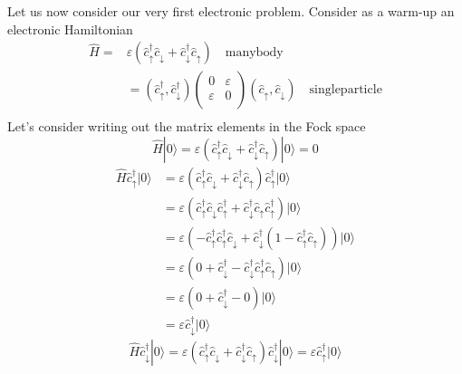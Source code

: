 Let us now consider our very first electronic problem. Consider as a warm-up an electronic Hamiltonian
\begin{align*}
    \hat{H}=&\varepsilon \left( \hat{c}_{\uparrow}^{\dagger}\hat{c}_{\downarrow}+\hat{c}_{\downarrow}^{\dagger}\hat{c}_{\uparrow} \right) \quad \mathrm{many body}\\
    &=\left( \hat{c}_{\uparrow}^{\dagger},\hat{c}_{\downarrow}^{\dagger} \right) \left( \begin{matrix}
        0&		\varepsilon\\
        \varepsilon&		0\\
    \end{matrix} \right) \left( \hat{c}_{\uparrow},\hat{c}_{\downarrow} \right) \quad \mathrm{single particle}\\
\end{align*}
Let's consider writing out the matrix elements in the Fock space
\[ \hat{H}|0\rangle =\varepsilon \left( \hat{c}_{\uparrow}^{\dagger}\hat{c}_{\downarrow}+\hat{c}_{\downarrow}^{\dagger}\hat{c}_{\uparrow} \right) |0\rangle =0\]
\begin{align*}
    \hat{H}\hat{c}_{\uparrow}^{\dagger}|0\rangle &=\varepsilon \left( \hat{c}_{\uparrow}^{\dagger}\hat{c}_{\downarrow}+\hat{c}_{\downarrow}^{\dagger}\hat{c}_{\uparrow} \right) \hat{c}_{\uparrow}^{\dagger}|0\rangle \\
    &=\varepsilon \left( \hat{c}_{\uparrow}^{\dagger}\hat{c}_{\downarrow}\hat{c}_{\uparrow}^{\dagger}+\hat{c}_{\downarrow}^{\dagger}\hat{c}_{\uparrow}\hat{c}_{\uparrow}^{\dagger} \right) |0\rangle \\
    &=\varepsilon \left( -\hat{c}_{\uparrow}^{\dagger}\hat{c}_{\uparrow}^{\dagger}\hat{c}_{\downarrow}+\hat{c}_{\downarrow}^{\dagger}\left( 1-\hat{c}_{\uparrow}^{\dagger}\hat{c}_{\uparrow} \right) \right) |0\rangle \\
    &=\varepsilon \left( 0+\hat{c}_{\downarrow}^{\dagger}-\hat{c}_{\downarrow}^{\dagger}\hat{c}_{\uparrow}^{\dagger}\hat{c}_{\uparrow} \right) |0\rangle \\
    &=\varepsilon \left( 0+\hat{c}_{\downarrow}^{\dagger}-0 \right) |0\rangle \\
    &=\varepsilon \hat{c}_{\downarrow}^{\dagger}|0\rangle
\end{align*}
\[ \hat{H}\hat{c}_{\downarrow}^{\dagger}|0\rangle =\varepsilon \left( \hat{c}_{\uparrow}^{\dagger}\hat{c}_{\downarrow}+\hat{c}_{\downarrow}^{\dagger}\hat{c}_{\uparrow} \right) \hat{c}_{\downarrow}^{\dagger}|0\rangle =\varepsilon \hat{c}_{\uparrow}^{\dagger}|0\rangle \]
